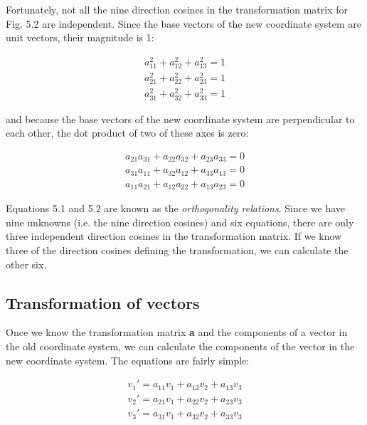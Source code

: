 \documentclass[a4paper , 12pt]{book}
\begin{document}
Fortunately, not all the nine direction cosines in the transformation matrix for Fig. 5.2 are independent. Since the base vectors of the new coordinate system are unit vectors, their magnitude is 1:

\begin{equation}
    \begin{gathered}
        a_{11}^2+a_{12}^2+a_{13}^2=1 \\
        a_{21}^2+a_{22}^2+a_{23}^2=1 \\
        a_{31}^2+a_{32}^2+a_{33}^2=1
    \end{gathered}
\end{equation}

and because the base vectors of the new coordinate system are perpendicular to each other, the dot product of two of these axes is zero:

\begin{equation}
    \begin{gathered}
        a_{21}a_{31}+a_{22}a_{32}+a_{23}a_{33}=0 \\
        a_{31}a_{11}+a_{32}a_{12}+a_{33}a_{13}=0 \\
        a_{11}a_{21}+a_{12}a_{22}+a_{13}a_{23}=0
    \end{gathered}
\end{equation}

Equations 5.1 and 5.2 are known as the \textit{orthogonality relations}. Since we have nine unknowns (i.e. the nine direction cosines) and six equations, there are only three independent direction cosines in the transformation matrix. If we know three of the direction cosines defining the transformation, we can calculate the other six.

\subsection{Transformation of vectors}\label{vectortransf}

Once we know the transformation matrix \textbf{a} and the components of a vector in the old coordinate system, we can calculate the components of the vector in the new coordinate system. The equations are fairly simple:

\begin{equation}
    \begin{gathered}
        v_1\text{$'$}=a_{11}v_1+a_{12}v_2+a_{13}v_3 \\
        v_2\text{$'$}=a_{21}v_1+a_{22}v_2+a_{23}v_3 \\
        v_3\text{$'$}=a_{31}v_1+a_{32}v_2+a_{33}v_3
    \end{gathered}
\end{equation}
\end{document}
